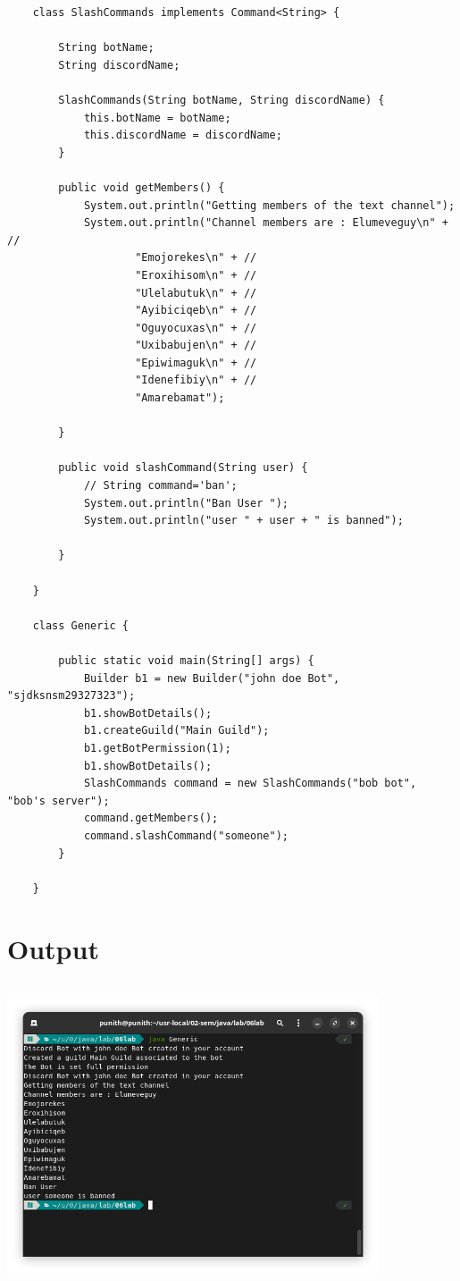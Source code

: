 \documentclass{article}
\begin{document}
\begin{lstlisting}
    class SlashCommands implements Command<String> {
    
        String botName;
        String discordName;
    
        SlashCommands(String botName, String discordName) {
            this.botName = botName;
            this.discordName = discordName;
        }
    
        public void getMembers() {
            System.out.println("Getting members of the text channel");
            System.out.println("Channel members are : Elumeveguy\n" + //
                    "Emojorekes\n" + //
                    "Eroxihisom\n" + //
                    "Ulelabutuk\n" + //
                    "Ayibiciqeb\n" + //
                    "Oguyocuxas\n" + //
                    "Uxibabujen\n" + //
                    "Epiwimaguk\n" + //
                    "Idenefibiy\n" + //
                    "Amarebamat");
    
        }
    
        public void slashCommand(String user) {
            // String command='ban';
            System.out.println("Ban User ");
            System.out.println("user " + user + " is banned");
    
        }
    
    }
    
    class Generic {
    
        public static void main(String[] args) {
            Builder b1 = new Builder("john doe Bot", "sjdksnsm29327323");
            b1.showBotDetails();
            b1.createGuild("Main Guild");
            b1.getBotPermission(1);
            b1.showBotDetails();
            SlashCommands command = new SlashCommands("bob bot", "bob's server");
            command.getMembers();
            command.slashCommand("someone");
        }
    
    }
\end{lstlisting}

\section*{Output}
\includegraphics[width=11cm, height=9cm]{./images/01.png}
\end{document}
